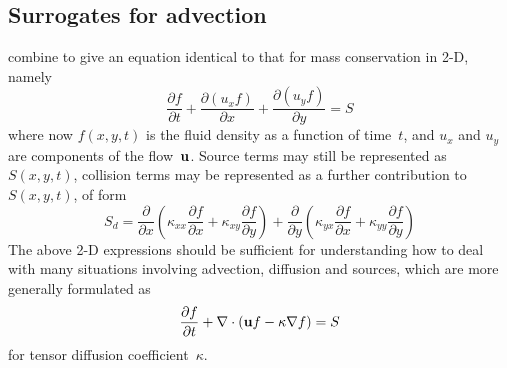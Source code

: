 \subsection{Surrogates for advection}\label{sec:adv}

 combine to give an equation identical to that for mass conservation in 2-D, namely
\begin{equation}\label{eq:masscon2d}
\frac{\partial f}{\partial t} +  \frac{\partial (u_x f) }{\partial x} + \frac{\partial (u_y f)}{\partial y} = S
\end{equation}
where now $f(x,y,t)$ is the fluid density as a function of time~$t$,
and $u_x$ and $u_y$  are components of the flow~${\bf u }$.
Source terms may still be represented as~$S(x,y,t)$, 
collision terms may be represented as a further contribution to~$S(x,y,t)$, of form
\begin{equation}\label{eq:diffus}
S_d=\frac{\partial}{\partial x} \left( \kappa_{xx} \frac{\partial f}{\partial x} +
\kappa_{xy} \frac{\partial f}{\partial y} \right) +
\frac{\partial}{\partial y} \left( \kappa_{yx} \frac{\partial f}{\partial x} +
\kappa_{yy} \frac{\partial f}{\partial y} \right)
\end{equation}
The above 2-D expressions should be sufficient for understanding how to deal with many
situations involving advection, diffusion and sources, which are more generally formulated as
\begin{equation}\label{eq:AD}
\frac{\partial f}{\partial t} + \nabla \cdot ({\bf u} f-\kappa \nabla f) =S
\end{equation}
for tensor diffusion coefficient~$\kappa$.

